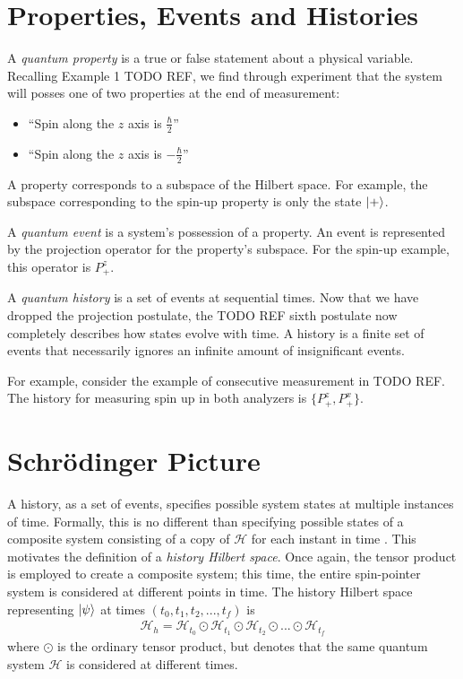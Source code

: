 \section{Properties, Events and Histories}

A \textit{quantum property} is a true or false statement about a physical variable. Recalling Example 1 TODO REF, we find through experiment that the system will posses one of two properties at the end of measurement:
\begin{itemize}
  \item ``Spin along the $z$ axis is $\frac{\hbar}{2}$''
  \item ``Spin along the $z$ axis is $-\frac{\hbar}{2}$''
\end{itemize}

A property corresponds to a subspace of the Hilbert space. For example, the subspace corresponding to the spin-up property is only the state $\ket{+}$.

A \textit{quantum event} is a system's possession of a property. An event is represented by the projection operator for the property's subspace. For the spin-up example, this operator is $P^z_+$.

A \textit{quantum history} is a set of events at sequential times. Now that we have dropped the projection postulate, the TODO REF sixth postulate now completely describes how states evolve with time. A history is a finite set of events that necessarily ignores an infinite amount of insignificant events.

For example, consider the example of consecutive measurement in TODO REF. The history for measuring spin up in both analyzers is $\{P^z_+, P^x_+\}$.

\section{Schrödinger Picture}
A history, as a set of events, specifies possible system states at multiple instances of time. Formally, this is no different than specifying possible states of a composite system consisting of a copy of $\mathcal{H}$ for each instant in time \cite{Griffiths}. This motivates the definition of a \textit{history Hilbert space}. Once again, the tensor product is employed to create a composite system; this time, the entire spin-pointer system is considered at different points in time. The history Hilbert space representing $\ket{\psi}$ at times $\left(t_0, t_1, t_2, ..., t_f \right)$ is
\begin{align}
  {\mathcal{H}}_h = \mathcal{H}_{t_0} \odot \mathcal{H}_{t_1} \odot \mathcal{H}_{t_2} \odot ... \odot \mathcal{H}_{t_f}
\end{align}
where $\odot$ is the ordinary tensor product, but denotes that the same quantum system $\mathcal{H}$ is considered at different times.

